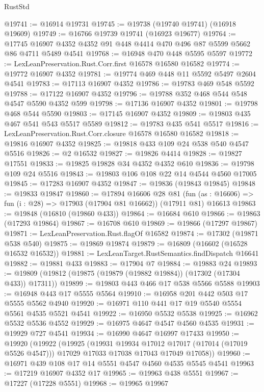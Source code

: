 \begin{lexlean}{RustStd}
\begin{coremodule}
@19741 := @16914 @19731
@19745 := @19738 (@19740 @19741) (@16918 @19609)
@19749 := @16766 @19739 @19741 (@16923 @19677)
@19764 := @17745 @16907 @4352 @4352 @91 @448 @4414 @470 @496 @87 @5599 @5662 @86 @4711 @5489 @4541
@19768 := @16948 @470 @448 @5595 @5597
@19772 := LexLeanPreservation.Rust.Corr.first @16578 @16580 @16582
@19774 := @19772 @16907 @4352
@19781 := @19774 @469 @448 @11 @5592 @5497 @2604 @4541
@19783 := @17113 @16907 @4352
@19786 := @19783 @469 @548 @5592
@19788 := @17122 @16907 @4352
@19796 := @19788 @352 @468 @544 @548 @4547 @5590 @4352 @599
@19798 := @17136 @16907 @4352
@19801 := @19798 @468 @544 @5590
@19803 := @17145 @16907 @4352
@19809 := @19803 @435 @467 @541 @543 @5517 @5589
@19812 := @19783 @435 @541 @5517
@19816 := LexLeanPreservation.Rust.Corr.closure @16578 @16580 @16582
@19818 := @19816 @16907 @4352
@19825 := @19818 @433 @109 @24 @538 @540 @4547 @5516
@19826 := @2 @16532
@19827 := @19826 @4414
@19828 := @19827 @17551
@19833 := @19825 @19828 @34 @4352 @4352 @610
@19836 := @19798 @109 @24 @5516
@19843 := @19803 @106 @108 @22 @14 @4544 @4560 @17005
@19845 := @17283 @16907 @4352
@19847 := @19836 (@19843 @19845)
@19848 := @19833 @19847
@19860 := @17894
    @16606
    @28
    @81
    (fun (as : @16606) => fun (i : @28) => @17903 (@17904 @81 @16662))
    (@17911 @81)
    @16613
@19863 := @19848 (@16810 (@19860 @433))
@19864 := @16684 @610
@19866 := @19863 (@17293 @19864)
@19867 := @16708 @610
@19869 := @19866 (@17297 @19867)
@19871 := LexLeanPreservation.Rust.flagOf @16582
@19874 := @17302 (@19871 @538 @540)
@19875 := @19869 @19874
@19879 := @16809 (@16602 (@16528 @16532 @16532))
@19881 := LexLeanTarget.RustSemantics.findDispatch @16641
@19882 := @19881 @433
@19883 := @17904 @7
@19884 := @19883 @24
@19893 := @19809 (@19812 (@19875 (@19879 (@19882 @19884)) (@17302 (@17304 @433)) @17311))
@19899 := @19803 @443 @466 @17 @538 @5566 @5588
@19903 := @16948 @443 @17 @5555 @5564
@19910 := @16958 @201 @442 @503 @17 @5555 @5562 @4940
@19920 := @16971 @110 @441 @17 @19 @5540 @5554 @5561 @4535 @5521 @4541
@19922 := @16950 @5532 @5538
@19925 := @16962 @5532 @5536 @4552
@19929 := @16975 @4647 @4547 @4560 @4535
@19931 := @19929 @727 @4541
@19934 := @16990 @4647 @16997 @17433
@19950 := @19920
    (@19922
      (@19925
        (@19931 @19934 @17012 @17017 (@17014 (@17019 @5526 @4547)))
        @17029
        @17033
        @17038
        @17043
        @17049
        @17058))
@19960 := @16971 @439 @108 @17 @14 @5551 @4547 @4560 @4535 @5545 @4541
@19963 := @17219 @16907 @4352 @17
@19965 := @19963 @438 @5551
@19967 := @17227 (@17228 @5551)
@19968 := @19965 @19967

\end{coremodule}
\end{lexlean}
